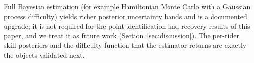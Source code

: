 Full Bayesian estimation (for example Hamiltonian Monte Carlo with a Gaussian
process difficulty) yields richer posterior uncertainty bands and is a documented
upgrade; it is not required for the point-identification and recovery results of
this paper, and we treat it as future work (Section~\ref{sec:discussion}). The
per-rider skill posteriors and the difficulty function that the estimator returns
are exactly the objects validated next.
